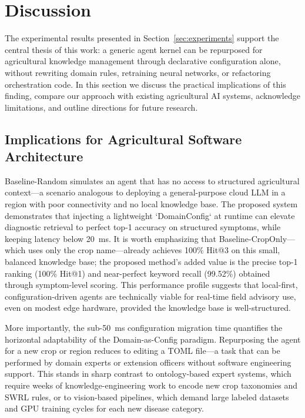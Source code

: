 \section{Discussion}
\label{sec:discussion}

The experimental results presented in Section~\ref{sec:experiments} support the central thesis of this work: a generic agent kernel can be repurposed for agricultural knowledge management through declarative configuration alone, without rewriting domain rules, retraining neural networks, or refactoring orchestration code. In this section we discuss the practical implications of this finding, compare our approach with existing agricultural AI systems, acknowledge limitations, and outline directions for future research.

\subsection{Implications for Agricultural Software Architecture}

Baseline-Random simulates an agent that has no access to structured agricultural context---a scenario analogous to deploying a general-purpose cloud LLM in a region with poor connectivity and no local knowledge base. The proposed system demonstrates that injecting a lightweight `DomainConfig` at runtime can elevate diagnostic retrieval to perfect top-1 accuracy on structured symptoms, while keeping latency below 20~ms. It is worth emphasizing that Baseline-CropOnly---which uses only the crop name---already achieves 100\% Hit@3 on this small, balanced knowledge base; the proposed method's added value is the precise top-1 ranking (100\% Hit@1) and near-perfect keyword recall (99.52\%) obtained through symptom-level scoring. This performance profile suggests that local-first, configuration-driven agents are technically viable for real-time field advisory use, even on modest edge hardware, provided the knowledge base is well-structured.

More importantly, the sub-50~ms configuration migration time quantifies the horizontal adaptability of the Domain-as-Config paradigm. Repurposing the agent for a new crop or region reduces to editing a TOML file---a task that can be performed by domain experts or extension officers without software engineering support. This stands in sharp contrast to ontology-based expert systems, which require weeks of knowledge-engineering work to encode new crop taxonomies and SWRL rules, or to vision-based pipelines, which demand large labeled datasets and GPU training cycles for each new disease category.

